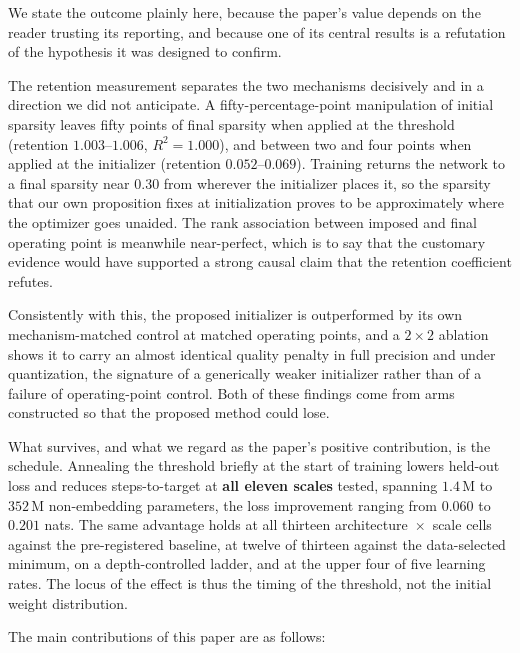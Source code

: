 \documentclass[final,5p,times,twocolumn]{elsarticle}
\theoremstyle{remark}
\begin{document}
We state the outcome plainly here, because the paper's value depends on the
reader trusting its reporting, and because one of its central results is a
refutation of the hypothesis it was designed to confirm.

The retention measurement separates the two mechanisms decisively and in a
direction we did not anticipate. A fifty-percentage-point manipulation of
initial sparsity leaves fifty points of final sparsity when applied at the
threshold (retention $1.003$--$1.006$, $R^{2} = 1.000$), and between two and
four points when applied at the initializer (retention $0.052$--$0.069$).
Training returns the network to a final sparsity near $0.30$ from wherever
the initializer places it, so the sparsity that our own proposition fixes at
initialization proves to be approximately where the optimizer goes unaided. The rank association between imposed and final
operating point is meanwhile near-perfect, which is to say that the customary
evidence would have supported a strong causal claim that the retention
coefficient refutes.

Consistently with this, the proposed initializer is outperformed by its own
mechanism-matched control at matched operating points, and a
$2 \times 2$ ablation shows it to carry an almost identical quality penalty in
full precision and under quantization, the signature of a generically weaker
initializer rather than of a failure of operating-point control. Both of these
findings come from arms constructed so that the proposed method could lose.

What survives, and what we regard as the paper's positive contribution, is the
schedule. Annealing the threshold briefly at the start of training lowers
held-out loss and reduces steps-to-target at \textbf{all eleven scales}
tested, spanning $1.4$\,M to $352$\,M non-embedding parameters, the loss
improvement ranging from $0.060$ to $0.201$ nats. The same advantage holds at
all thirteen architecture~$\times$~scale cells against the pre-registered
baseline, at twelve of thirteen against the data-selected minimum, on a
depth-controlled ladder, and at the upper four of five learning rates. The
locus of the effect is thus the timing of the threshold, not the
initial weight distribution.

The main contributions of this paper are as follows:
\end{document}
